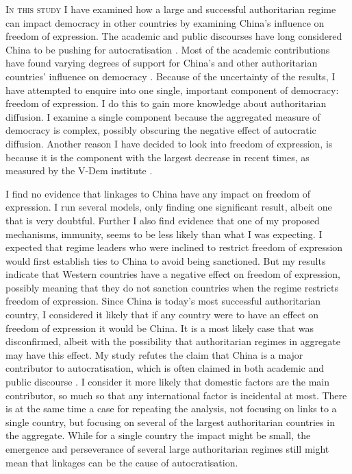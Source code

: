 \lettrine{I}{n this study} I have examined how a large and successful authoritarian regime can impact democracy in other countries by examining China's influence on freedom of expression. The academic and public discourses have long considered China to be pushing for autocratisation \citep{jintao_chinas_2023, biden_remarks_2021, economy_exporting_2020, repucci_authoritarians_2022, repucci_global_2022}. Most of the academic contributions have found varying degrees of support for China's and other authoritarian countries' influence on democracy \citep{loughlin_chinese_2021, risse_democracy_2015, tansey_ties_2017, weyland_autocratic_2017, wong_chinese_2019}. Because of the uncertainty of the results, I have attempted to enquire into one single, important component of democracy: freedom of expression. I do this to gain more knowledge about authoritarian diffusion. I examine a single component because the aggregated measure of democracy is complex, possibly obscuring the negative effect of autocratic diffusion. Another reason I have decided to look into freedom of expression, is because it is the component with the largest decrease in recent times, as measured by the V-Dem institute \citep{nord_democracy_2025}.

I find no evidence that linkages to China have any impact on freedom of expression. I run several models, only finding one significant result, albeit one that is very doubtful. Further I also find evidence that one of my proposed mechanisms, immunity, seems to be less likely than what I was expecting. I expected that regime leaders who were inclined to restrict freedom of expression would first establish ties to China to avoid being sanctioned. But my results indicate that Western countries have a negative effect on freedom of expression, possibly meaning that they do not sanction countries when the regime restricts freedom of expression. Since China is today's most successful authoritarian country, I considered it likely that if any country were to have an effect on freedom of expression it would be China. It is a most likely case that was disconfirmed, albeit with the possibility that authoritarian regimes in aggregate may have this effect. My study refutes the claim that China is a major contributor to autocratisation, which is often claimed in both academic and public discourse \citep{jintao_chinas_2023, biden_remarks_2021, economy_exporting_2020, repucci_authoritarians_2022, repucci_global_2022}. I consider it more likely that domestic factors are the main contributor, so much so that any international factor is incidental at most. There is at the same time a case for repeating the analysis, not focusing on links to a single country, but focusing on several of the largest authoritarian countries in the aggregate. While for a single country the impact might be small, the emergence and perseverance of several large authoritarian regimes still might mean that linkages can be the cause of autocratisation.

